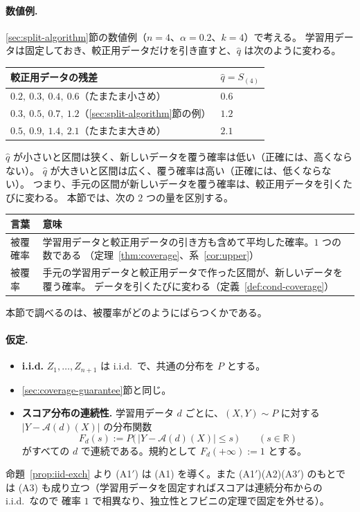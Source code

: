 \documentclass[a4paper,11pt]{jsarticle}
\theoremstyle{definition}
\theoremstyle{plain}
\theoremstyle{remark}
\newcommand{\Real}{\mathbb{R}}
\newcommand{\qhat}{\hat{q}}
\begin{document}
\paragraph{数値例.}
\ref{sec:split-algorithm}節の数値例（$n=4$、$\alpha=0.2$、$k=4$）で考える。
学習用データは固定しておき、較正用データだけを引き直すと、$\qhat$ は次のように変わる。
\begin{center}
  \begin{tabular}{ll}
    \toprule
    較正用データの残差 & $\qhat=S_{(4)}$ \\
    \midrule
    $0.2,\ 0.3,\ 0.4,\ 0.6$（たまたま小さめ） & $0.6$ \\
    $0.3,\ 0.5,\ 0.7,\ 1.2$（\ref{sec:split-algorithm}節の例） & $1.2$ \\
    $0.5,\ 0.9,\ 1.4,\ 2.1$（たまたま大きめ） & $2.1$ \\
    \bottomrule
  \end{tabular}
\end{center}
$\qhat$ が小さいと区間は狭く、新しいデータを覆う確率は低い（正確には、高くならない）。
$\qhat$ が大きいと区間は広く、覆う確率は高い（正確には、低くならない）。
つまり、手元の区間が新しいデータを覆う確率は、較正用データを引くたびに変わる。
本節では、次の $2$ つの量を区別する。
\begin{center}
  \begin{tabular}{lp{}}
    \toprule
    言葉 & 意味 \\
    \midrule
    被覆確率 & 学習用データと較正用データの引き方も含めて平均した確率。$1$ つの数である
      （定理~\ref{thm:coverage}、系~\ref{cor:upper}） \\
    被覆率 & 手元の学習用データと較正用データで作った区間が、新しいデータを覆う確率。
      データを引くたびに変わる（定義~\ref{def:cond-coverage}） \\
    \bottomrule
  \end{tabular}
\end{center}
本節で調べるのは、被覆率がどのようにばらつくかである。

\paragraph{仮定.}
\begin{itemize}
  \item[\textbf{(A1$'$)}] \textbf{i.i.d.}
    $Z_1,\dots,Z_{n+1}$ は i.i.d.\ で、共通の分布を $P$ とする。
  \item[\textbf{(A2)}] \ref{sec:coverage-guarantee}節と同じ。
  \item[\textbf{(A3$'$)}] \textbf{スコア分布の連続性.}
    学習用データ $d$ ごとに、$(X,Y)\sim P$ に対する $|Y-\mathcal{A}(d)(X)|$ の分布関数
    \begin{equation}
      \label{eq:score-cdf}
      F_d(s):=P\bigl(\,|Y-\mathcal{A}(d)(X)|\le s\,\bigr)\qquad(s\in\Real)
    \end{equation}
    がすべての $d$ で連続である。規約として $F_d(+\infty):=1$ とする。
\end{itemize}
命題~\ref{prop:iid-exch} より (A1$'$) は (A1) を導く。また (A1$'$)(A2)(A3$'$) のもとでは
(A3) も成り立つ（学習用データを固定すればスコアは連続分布からの i.i.d.\ なので
確率 $1$ で相異なり、独立性とフビニの定理で固定を外せる）。
\end{document}
